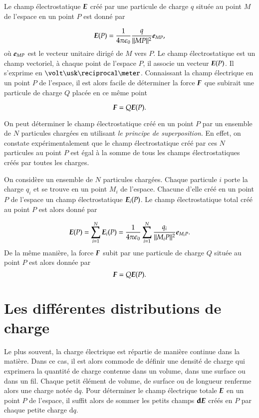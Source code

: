 \begin{defn}
	Le champ électrostatique $\vece$ créé par une particule de charge $q$
	située au point $M$ de l'espace en un point $P$ est donné par

	\begin{equation}
		\vece(P) = \pieps \dfrac{q}{||MP||^2}\mitbf{e}_{MP},
	\end{equation}
	où $\mitbf{e}_{MP}$ est le vecteur unitaire dirigé de $M$ vers $P$.
	Le champ électrostatique est un champ vectoriel, à chaque point 
	de l'espace $P$, il associe un vecteur $\vece(P)$.
	Il s'exprime en $\volt \usk \reciprocal \meter$. 
	Connaissant la champ électrique en un point $P$ de l'espace, il est alors
	facile de déterminer la force $\vecf$ que subirait une particule de charge
	$Q$ placée en ce même point

	\begin{equation}
		\vecf = Q\vece(P).
	\end{equation}
\end{defn}

On peut déterminer le champ électrostatique 
créé en un point $P$ par un ensemble de $N$ particules chargées en utilisant
\emph{le principe de superposition}.
En effet, on constate expérimentalement que le champ électrostatique créé par ces
$N$ particules au point $P$ est égal à la somme de tous les champs
électrostatiques créés par toutes les charges.

\begin{defn}
	On considère un ensemble de $N$ particules chargées. Chaque particule $i$
	porte la charge $q_i$ et se trouve en un point $M_i$ de l'espace. Chacune
	d'elle créé en un point $P$ de l'espace un champ électrostatique $\vece_i(P)$.
	Le champ électrostatique total créé au point $P$ est alors donné par 

	\begin{equation}
		\vece(P) = \sum_{i=1}^{N} \vece_i(P)
			 = \pieps \sum_{i=1}^{N} \dfrac{q_i}{||M_i P||^2}
			   \mitbf{e}_{M_i P}.
		\label{eq:superposition}
	\end{equation}
	De la même manière, la force $\vecf$ subit par une particule de charge $Q$ 
	située au point $P$ est alors donnée par
	\begin{equation}
		\vecf = Q \vece(P).
	\end{equation}
\end{defn}

\section{Les différentes distributions de charge}
Le plus souvent, la charge électrique est répartie de manière continue dans la 
matière. Dans ce cas, il est alors commode de définir une densité de charge qui
exprimera la quantité de charge contenue dans un volume, dans
une surface ou dans un fil. Chaque petit élément de volume, de surface ou de 
longueur renferme alors une charge notée $\mathrm{d}q$. Pour déterminer le 
champ électrique totale $\vece$ en un point $P$ de l'espace, 
il suffit alors de sommer les petits champs $\mathrm{\textbf{d}}\vece$ créés en $P$ 
par chaque petite charge $\mathrm{d}q$.

